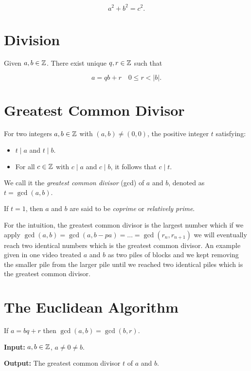 \[
	a^2 + b^2 = c^2.
\]

\section{Division}

Given \(a,b \in \mathbb{Z}\). There exist unique \(q,r \in \mathbb{Z}\) such that

\[
	a = qb + r \quad 0 \le r < |b|.
\]

\section{Greatest Common Divisor}

For two integers \(a, b \in \mathbb{Z}\) with \((a,b) \neq (0,0)\), the positive integer \(t\) satisfying:

\begin{itemize}

	\item \(t \mid a\) and \(t \mid b\).

	\item For all \(c \in \mathbb{Z}\) with \(c \mid a\) and \(c \mid b\), it follows that \(c \mid t\).

\end{itemize}

We call it the \emph{greatest common divisor} (gcd) of \(a\) and \(b\), denoted as \(t = \gcd(a,b)\).

If \(t = 1\), then \(a\) and \(b\) are said to be \emph{coprime} or \emph{relatively prime}.

For the intuition, the greatest common divisor is the largest number which if we apply
\(\gcd(a, b) = \gcd(a, b - pa) = \dots = \gcd(r_n, r_{n + 1})\) we will eventually reach two identical numbers which is the greatest common divisor.
An example given in one video treated \(a\) and \(b\) as two piles of blocks and we kept removing the smaller pile from the larger pile until
we reached two identical piles which is the greatest common divisor.

\section{The Euclidean Algorithm}

If \(a = bq + r\) then \(\gcd(a, b) = \gcd(b, r)\).

\textbf{Input:} \(a, b \in \mathbb{Z}\), \(a \neq 0 \neq b\).

\textbf{Output:} The greatest common divisor \(t\) of \(a\) and \(b\).

